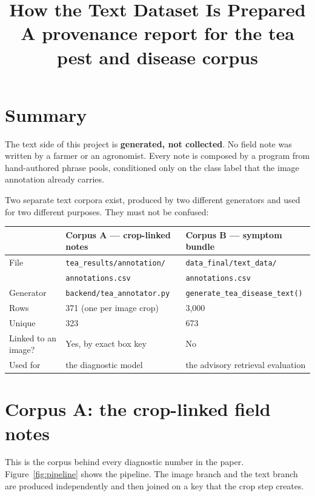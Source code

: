 \documentclass[11pt,a4paper]{article}
\title{\vspace{-1.2cm}\textbf{How the Text Dataset Is Prepared}\\[2pt]
\large A provenance report for the tea pest and disease corpus}
\author{}
\date{}
\newcommand{\code}[1]{\texttt{\small #1}}
\begin{document}
\maketitle
\vspace{-1.4cm}

\section*{Summary}

The text side of this project is \textbf{generated, not collected}. No field note
was written by a farmer or an agronomist. Every note is composed by a program
from hand-authored phrase pools, conditioned only on the class label that the
image annotation already carries.

Two separate text corpora exist, produced by two different generators and used
for two different purposes. They must not be confused:

\begin{center}
\small
\begin{tabular}{@{}lll@{}}
\toprule
& \textbf{Corpus A --- crop-linked notes} & \textbf{Corpus B --- symptom bundle}\\
\midrule
File     & \code{tea\_results/annotation/} & \code{data\_final/text\_data/}\\
         & \code{annotations.csv}          & \code{annotations.csv}\\
Generator& \code{backend/tea\_annotator.py} & \code{generate\_tea\_disease\_text()}\\
Rows     & 371 (one per image crop)        & 3{,}000\\
Unique   & 323                             & 673\\
Linked to an image? & Yes, by exact box key & No\\
Used for & the diagnostic model            & the advisory retrieval evaluation\\
\bottomrule
\end{tabular}
\end{center}

\section{Corpus A: the crop-linked field notes}

This is the corpus behind every diagnostic number in the paper. Figure~\ref{fig:pipeline}
shows the pipeline. The image branch and the text branch are produced
independently and then joined on a key that the crop step creates.
\end{document}
